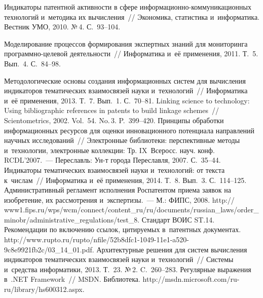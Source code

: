 \begin{multicols}{2}
{{\begin{thebibliography}{99}
 Индикаторы патентной активности
в сфере ин\-фор\-ма\-ци\-он\-но-ком\-му\-ни\-ка\-ци\-он\-ных технологий и~методика их
вычисления~// Экономика, статистика и~информатика. Вестник УМО, 2010. №\,4.
С.~93--104.

 Моделирование процессов формирования экспертных
знаний для мониторинга про\-грам\-мно-це\-ле\-вой деятельности~// Информатика и~её
применения, 2011. Т.~5. Вып.~4. С.~84--98.

 Методологические
основы создания информационных систем для вычисления индикаторов темати\-ческих
взаимосвязей науки и~технологий~// Информатика и~её применения, 2013. Т.~7. Вып.~1.
С.~70--81.
 Linking
science to technology: Using bibliographic references in patents to build linkage schemes~//
Scientometrics, 2002. Vol.~54. No.\,3. P.~399--420.
 Принципы обработки информационных ресурсов
для оценки инновационного потенциала направлений научных исследований~//
Электронные библиотеки: перспективные методы и~технологии, электронные коллекции:
Тр. IX~Всеросс. науч. конф. RCDL'2007.~--- Переславль: Ун-т города
Переславля, 2007. С.~35--44.
 Индикаторы
тематических взаимосвязей науки и~технологий: от текста к~числам~// Информатика и~её
применения, 2014. Т.~8. Вып.~3. С.~114--125.
Административный регламент исполнения Роспатентом приема заявок на изобретение,
их рас\-смот\-ре\-ния и~экспертизы.~--- М.: ФИПС, 2008. {\sf
http:// www1.fips.ru/wps/wcm/connect/content\_ru/ru/docum\linebreak ents/russian\_laws/order\_minobr/administrative\_regulati\linebreak ons/test\_8}.
Стандарт ВОИС ST.14. Рекомендации по включению ссылок, цитируемых в~патентных
документах. {\sf
http://www.rupto.ru/rupto/nfile/52b8dfc1-1049-11e1-a520-9c8e9921fb2c/03\_14\_01.pdf}.
 Архитектурные
решения для систем вы\-чис\-ле\-ния индикаторов тематических взаимосвязей науки и~технологий~// Системы и~средства информатики, 2013. Т.~23. №\,2. C.~260--283.
Регулярные выражения в~.NET Framework~// MSDN. Библиотека. {\sf
http://msdn.microsoft.com/ru-ru/library/hs600312.aspx}.


\end{thebibliography}}}
\end{multicols}
